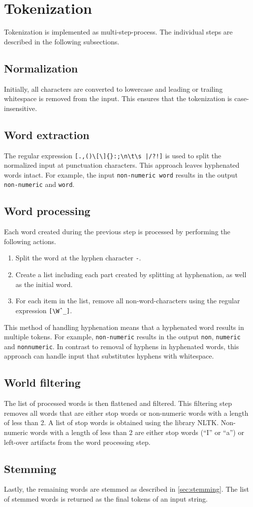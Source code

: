 \section{Tokenization}
\label{sec:tokenization}

Tokenization is implemented as multi-step-process.
The individual steps are described in the following subsections.

\subsection{Normalization}
Initially, all characters are converted to lowercase and leading or trailing whitespace is removed from the input.
This ensures that the tokenization is case-insensitive.

\subsection{Word extraction}
The regular expression \verb=[.,()\[\]{}:;\n\t\s |/?!]= is used to split the normalized input at punctuation characters.
This approach leaves hyphenated words intact.
For example, the input \verb|non-numeric word| results in the output \verb|non-numeric| and \verb|word|.

\subsection{Word processing}
Each word created during the previous step is processed by performing the following actions.

\begin{enumerate}
  \item Split the word at the hyphen character \verb|-|.
  \item Create a list including each part created by splitting at hyphenation, as well as the initial word.
  \item For each item in the list, remove all non-word-characters using the regular expression \verb|[\Wˆ_]|.
\end{enumerate}

This method of handling hyphenation means that a hyphenated word results in multiple tokens.
For example, \verb|non-numeric| results in the output \verb|non|, \verb|numeric| and \verb|nonnumeric|.
In contrast to removal of hyphens in hyphenated words, this approach can handle input that substitutes hyphens with whitespace.

\subsection{World filtering}
The list of processed words is then flattened and filtered.
This filtering step removes all words that are either stop words or non-numeric words with a length of less than 2.
A list of stop words is obtained using the library NLTK.
Non-numeric words with a length of less than 2 are either stop words (\enquote{I} or \enquote{a}) or left-over artifacts from the word processing step.

\subsection{Stemming}
Lastly, the remaining words are stemmed as described in \cref{sec:stemming}.
The list of stemmed words is returned as the final tokens of an input string.
